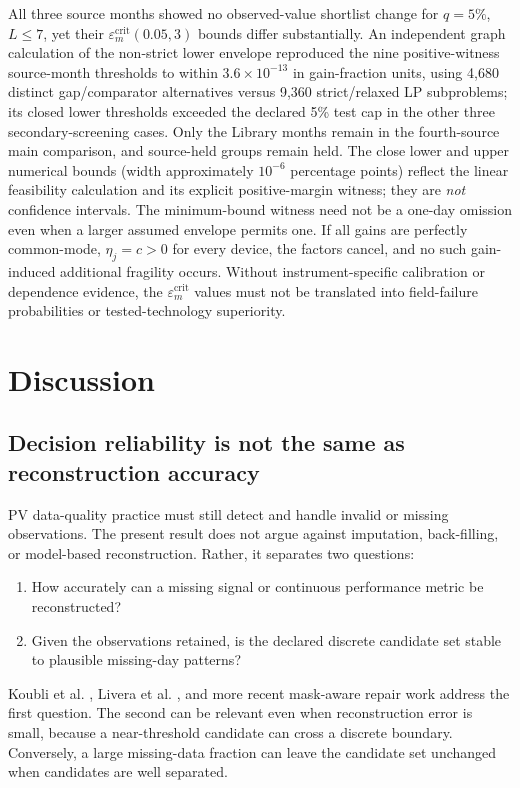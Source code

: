 \documentclass[preprint,12pt]{elsarticle}
\begin{document}
All three source months showed no observed-value shortlist change for $q=5\%$, $L\leq7$, yet their $\varepsilon_m^{\mathrm{crit}}(0.05,3)$ bounds differ substantially. An independent graph calculation of the non-strict lower envelope reproduced the nine positive-witness source-month thresholds to within $3.6\times10^{-13}$ in gain-fraction units, using 4,680 distinct gap/comparator alternatives versus 9,360 strict/relaxed LP subproblems; its closed lower thresholds exceeded the declared 5\% test cap in the other three secondary-screening cases. Only the Library months remain in the fourth-source main comparison, and source-held groups remain held. The close lower and upper numerical bounds (width approximately $10^{-6}$ percentage points) reflect the linear feasibility calculation and its explicit positive-margin witness; they are \emph{not} confidence intervals. The minimum-bound witness need not be a one-day omission even when a larger assumed envelope permits one. If all gains are perfectly common-mode, $\eta_j=c>0$ for every device, the factors cancel, and no such gain-induced additional fragility occurs. Without instrument-specific calibration or dependence evidence, the $\varepsilon_m^{\mathrm{crit}}$ values must not be translated into field-failure probabilities or tested-technology superiority.

\section{Discussion}
\subsection{Decision reliability is not the same as reconstruction accuracy}
PV data-quality practice must still detect and handle invalid or missing observations. The present result does not argue against imputation, back-filling, or model-based reconstruction. Rather, it separates two questions:
\begin{enumerate}[leftmargin=1.5em]
    \item How accurately can a missing signal or continuous performance metric be reconstructed?
    \item Given the observations retained, is the declared discrete candidate set stable to plausible missing-day patterns?
\end{enumerate}
Koubli et al. \cite{koubli2016}, Livera et al. \cite{livera2021}, and more recent mask-aware repair work \cite{wang2026} address the first question. The second can be relevant even when reconstruction error is small, because a near-threshold candidate can cross a discrete boundary. Conversely, a large missing-data fraction can leave the candidate set unchanged when candidates are well separated.
\end{document}
